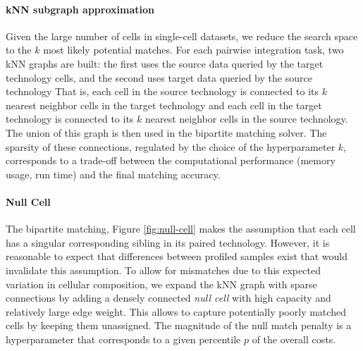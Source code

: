 
\paragraph{kNN subgraph approximation}
Given the large number of cells in single-cell datasets, we reduce the search space to the $k$ most likely potential matches.
For each pairwise integration task, two kNN graphs are built: the first uses the source data queried by the target technology cells, and the second uses target data queried by the source technology
That is, each cell in the source technology is connected to its $k$ nearest neighbor cells in the target technology and each cell in the target technology is connected to its $k$ nearest neighbor cells in the source technology.
The union of this graph is then used in the bipartite matching solver.
The sparsity of these connections, regulated by the choice of the hyperparameter $k$, corresponds to a trade-off between the computational performance (memory usage, run time) and the final matching accuracy.

\paragraph{Null Cell}
The bipartite matching, Figure \ref{fig:null-cell} makes the assumption that each cell has a singular corresponding sibling in its paired technology.
However, it is reasonable to expect that differences between profiled samples exist that would invalidate this assumption.
To allow for mismatches due to this expected variation in cellular composition,
we expand the kNN graph with sparse connections by adding a densely connected \textit{null cell} with high capacity and relatively large edge weight. 
This allows to capture potentially poorly matched cells by keeping them unassigned.
The magnitude of the null match penalty is a hyperparameter that corresponds to a given percentile $p$ of the overall costs.

